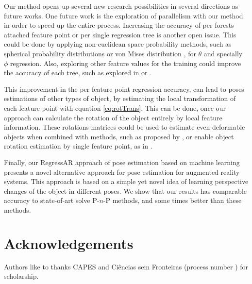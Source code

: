 \documentclass[annual]{acmsiggraph}
\begin{document}
Our method opens up several new research possibilities in several directions as future works. One future work is the exploration of parallelism with our method in order to speed up the entire process. Increasing the accuracy of per forests attached feature point or per single regression tree is another open issue. This could be done by applying non-euclidean space probability methods, such as spherical probability distributions or von Mises distribution \cite{Abramowitz:1974}, for $\theta$ and specially $\phi$ regression. Also, exploring other feature values for the training could improve the accuracy of each tree, such as explored in \cite{Criminisi:Book} or \cite{Shotton:2013}. 

This improvement in the per feature point regression accuracy, can lead to poses estimations of other types of object, by estimating the local transformation of each feature point with equation \eqref{eq:rotTrans}. This can be done, once our approach can calculate the rotation of the object entirely by local feature information. These rotations matrices could be used to estimate even deformable objects when combined with methods, such as proposed by \cite{Rendl:2014}, or enable object rotation estimation by single feature point, as in \cite{Tokunaga:2015}. 


Finally, our RegressAR approach of pose estimation based on machine learning presents a novel alternative approach for pose estimation for augmented reality systems. This approach is based on a simple yet novel idea of learning perspective changes of the object in different poses. We show that our results has comparable accuracy to state-of-art solve P-$n$-P methods, and some times better than these methods.  

\section*{Acknowledgements}
Authors like to thanks CAPES and Ci\^{e}ncias sem Fronteiras (process number ) for scholarship. 



\end{document}
